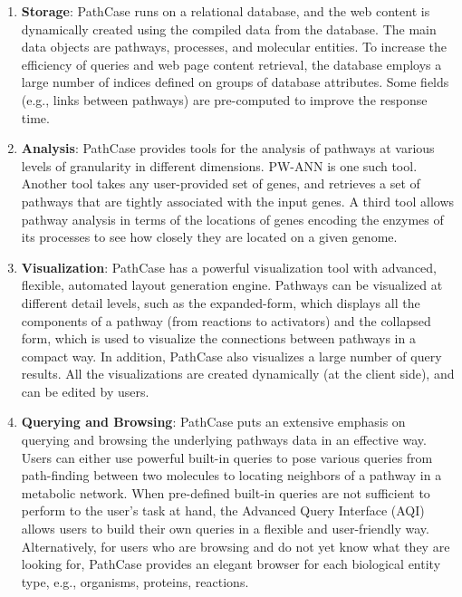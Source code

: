 \begin{enumerate}

    \item \textbf{Storage}: PathCase runs on a relational database, and the web
    content is dynamically created using the compiled data from the database.
    The main data objects are pathways, processes, and molecular entities. To
    increase the efficiency of queries and web page content retrieval, the
    database employs a large number of indices defined on groups of database
    attributes.  Some fields (e.g., links between pathways) are pre-computed to
    improve the response time.

    \item \textbf{Analysis}: PathCase provides tools for the analysis of
    pathways at various levels of granularity in different dimensions. PW-ANN is
    one such tool. Another tool takes any user-provided set of genes, and
    retrieves a set of pathways that are tightly associated with the input
    genes. A third tool allows pathway analysis in terms of the locations of
    genes encoding the enzymes of its processes to see how closely they are
    located on a given genome. 

    \item \textbf{Visualization}: PathCase has a powerful visualization tool
    with advanced, flexible, automated layout generation engine. Pathways can be
    visualized at different detail levels, such as the expanded-form, which
    displays all the components of a pathway (from reactions to activators) and
    the collapsed form, which is used to visualize the connections between
    pathways in a compact way. In addition, PathCase also visualizes a large
    number of query results. All the visualizations are created dynamically (at
    the client side), and can be edited by users.  

    \item \textbf{Querying and Browsing}: PathCase puts an extensive emphasis on
    querying and browsing the underlying pathways data in an effective way.
    Users can either use powerful built-in queries to pose various queries from
    path-finding between two molecules to locating neighbors of a pathway in a
    metabolic network. When pre-defined built-in queries are not sufficient to
    perform to the user’s task at hand, the Advanced Query Interface (AQI)
    allows users to build their own queries in a flexible and user-friendly way.
    Alternatively, for users who are browsing and do not yet know what they are
    looking for, PathCase provides an elegant browser for each biological entity
    type, e.g., organisms, proteins, reactions.


\end{enumerate}
